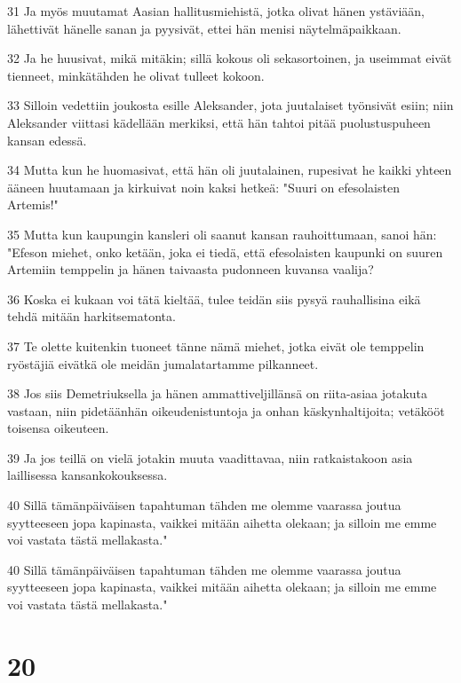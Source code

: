 \par 31 Ja myös muutamat Aasian hallitusmiehistä, jotka olivat hänen ystäviään, lähettivät hänelle sanan ja pyysivät, ettei hän menisi näytelmäpaikkaan.
\par 32 Ja he huusivat, mikä mitäkin; sillä kokous oli sekasortoinen, ja useimmat eivät tienneet, minkätähden he olivat tulleet kokoon.
\par 33 Silloin vedettiin joukosta esille Aleksander, jota juutalaiset työnsivät esiin; niin Aleksander viittasi kädellään merkiksi, että hän tahtoi pitää puolustuspuheen kansan edessä.
\par 34 Mutta kun he huomasivat, että hän oli juutalainen, rupesivat he kaikki yhteen ääneen huutamaan ja kirkuivat noin kaksi hetkeä: "Suuri on efesolaisten Artemis!"
\par 35 Mutta kun kaupungin kansleri oli saanut kansan rauhoittumaan, sanoi hän: "Efeson miehet, onko ketään, joka ei tiedä, että efesolaisten kaupunki on suuren Artemiin temppelin ja hänen taivaasta pudonneen kuvansa vaalija?
\par 36 Koska ei kukaan voi tätä kieltää, tulee teidän siis pysyä rauhallisina eikä tehdä mitään harkitsematonta.
\par 37 Te olette kuitenkin tuoneet tänne nämä miehet, jotka eivät ole temppelin ryöstäjiä eivätkä ole meidän jumalatartamme pilkanneet.
\par 38 Jos siis Demetriuksella ja hänen ammattiveljillänsä on riita-asiaa jotakuta vastaan, niin pidetäänhän oikeudenistuntoja ja onhan käskynhaltijoita; vetäkööt toisensa oikeuteen.
\par 39 Ja jos teillä on vielä jotakin muuta vaadittavaa, niin ratkaistakoon asia laillisessa kansankokouksessa.
\par 40 Sillä tämänpäiväisen tapahtuman tähden me olemme vaarassa joutua syytteeseen jopa kapinasta, vaikkei mitään aihetta olekaan; ja silloin me emme voi vastata tästä mellakasta."
\par 40 Sillä tämänpäiväisen tapahtuman tähden me olemme vaarassa joutua syytteeseen jopa kapinasta, vaikkei mitään aihetta olekaan; ja silloin me emme voi vastata tästä mellakasta."

\chapter{20}

